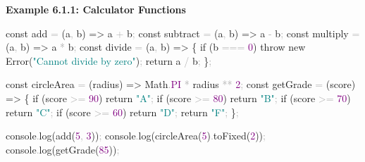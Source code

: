 \documentclass[
  justified,
  openright,
]{tufte-book}
\newcommand{\BuiltInTok}[1]{#1}
\newcommand{\ConstantTok}[1]{\textcolor{Purple}{#1}}
\newcommand{\ControlFlowTok}[1]{\textcolor{BrandBlue}{#1}}
\newcommand{\DecValTok}[1]{\textcolor{Purple}{#1}}
\newcommand{\FunctionTok}[1]{\textcolor{BrandBlue}{#1}}
\newcommand{\KeywordTok}[1]{\textcolor{BrandBlue}{#1}}
\newcommand{\NormalTok}[1]{#1}
\newcommand{\OperatorTok}[1]{\textcolor{DarkGray}{#1}}
\newcommand{\StringTok}[1]{\textcolor{Teal}{#1}}
\newenvironment{Shaded}{%
  \begin{snugshade}
}{%
  \end{snugshade}
}
\begin{document}
\textbf{Example 6.1.1: Calculator Functions}

\begin{Shaded}
\begin{Highlighting}[]
\KeywordTok{const}\NormalTok{ add }\OperatorTok{=}\NormalTok{ (a}\OperatorTok{,}\NormalTok{ b) }\KeywordTok{=\textgreater{}}\NormalTok{ a }\OperatorTok{+}\NormalTok{ b}\OperatorTok{;}
\KeywordTok{const}\NormalTok{ subtract }\OperatorTok{=}\NormalTok{ (a}\OperatorTok{,}\NormalTok{ b) }\KeywordTok{=\textgreater{}}\NormalTok{ a }\OperatorTok{{-}}\NormalTok{ b}\OperatorTok{;}
\KeywordTok{const}\NormalTok{ multiply }\OperatorTok{=}\NormalTok{ (a}\OperatorTok{,}\NormalTok{ b) }\KeywordTok{=\textgreater{}}\NormalTok{ a }\OperatorTok{*}\NormalTok{ b}\OperatorTok{;}
\KeywordTok{const}\NormalTok{ divide }\OperatorTok{=}\NormalTok{ (a}\OperatorTok{,}\NormalTok{ b) }\KeywordTok{=\textgreater{}}\NormalTok{ \{}
  \ControlFlowTok{if}\NormalTok{ (b }\OperatorTok{===} \DecValTok{0}\NormalTok{) }\ControlFlowTok{throw} \KeywordTok{new} \BuiltInTok{Error}\NormalTok{(}\StringTok{"Cannot divide by zero"}\NormalTok{)}\OperatorTok{;}
  \ControlFlowTok{return}\NormalTok{ a }\OperatorTok{/}\NormalTok{ b}\OperatorTok{;}
\NormalTok{\}}\OperatorTok{;}

\KeywordTok{const}\NormalTok{ circleArea }\OperatorTok{=}\NormalTok{ (radius) }\KeywordTok{=\textgreater{}} \BuiltInTok{Math}\OperatorTok{.}\ConstantTok{PI} \OperatorTok{*}\NormalTok{ radius }\OperatorTok{**} \DecValTok{2}\OperatorTok{;}
\KeywordTok{const}\NormalTok{ getGrade }\OperatorTok{=}\NormalTok{ (score) }\KeywordTok{=\textgreater{}}\NormalTok{ \{}
  \ControlFlowTok{if}\NormalTok{ (score }\OperatorTok{\textgreater{}=} \DecValTok{90}\NormalTok{) }\ControlFlowTok{return} \StringTok{"A"}\OperatorTok{;}
  \ControlFlowTok{if}\NormalTok{ (score }\OperatorTok{\textgreater{}=} \DecValTok{80}\NormalTok{) }\ControlFlowTok{return} \StringTok{"B"}\OperatorTok{;}
  \ControlFlowTok{if}\NormalTok{ (score }\OperatorTok{\textgreater{}=} \DecValTok{70}\NormalTok{) }\ControlFlowTok{return} \StringTok{"C"}\OperatorTok{;}
  \ControlFlowTok{if}\NormalTok{ (score }\OperatorTok{\textgreater{}=} \DecValTok{60}\NormalTok{) }\ControlFlowTok{return} \StringTok{"D"}\OperatorTok{;}
  \ControlFlowTok{return} \StringTok{"F"}\OperatorTok{;}
\NormalTok{\}}\OperatorTok{;}

\BuiltInTok{console}\OperatorTok{.}\FunctionTok{log}\NormalTok{(}\FunctionTok{add}\NormalTok{(}\DecValTok{5}\OperatorTok{,} \DecValTok{3}\NormalTok{))}\OperatorTok{;}
\BuiltInTok{console}\OperatorTok{.}\FunctionTok{log}\NormalTok{(}\FunctionTok{circleArea}\NormalTok{(}\DecValTok{5}\NormalTok{)}\OperatorTok{.}\FunctionTok{toFixed}\NormalTok{(}\DecValTok{2}\NormalTok{))}\OperatorTok{;}
\BuiltInTok{console}\OperatorTok{.}\FunctionTok{log}\NormalTok{(}\FunctionTok{getGrade}\NormalTok{(}\DecValTok{85}\NormalTok{))}\OperatorTok{;}
\end{Highlighting}
\end{Shaded}
\end{document}
